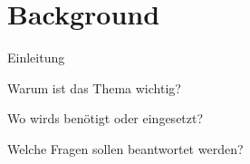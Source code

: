 \chapter{Background}
\label{chap:context}

Einleitung

Warum ist das Thema wichtig?

Wo wirds benötigt oder eingesetzt?

Welche Fragen sollen beantwortet werden?
